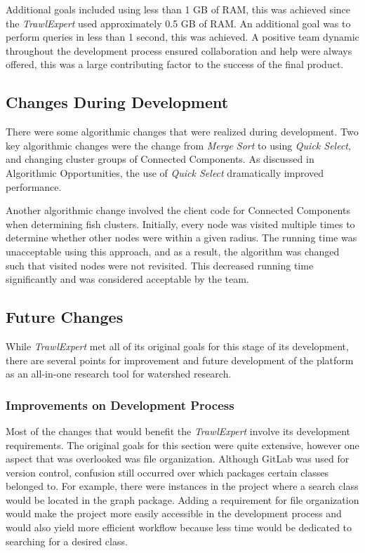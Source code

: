 \documentclass{article}
\begin{document}
Additional goals included using less than 1 GB of RAM, this was achieved since the \textit{TrawlExpert} used approximately 0.5 GB of RAM. An additional goal was to perform queries in less than 1 second, this was achieved. A positive team dynamic throughout the development process ensured collaboration and help were always offered, this was a large contributing factor to the success of the final product. 

\subsection{Changes During Development}
There were some algorithmic changes that were realized during development. Two key algorithmic changes were the change from \textit{Merge Sort} to using \textit{Quick Select}, and changing cluster groups of Connected Components. As discussed in Algorithmic Opportunities, the use of \textit{Quick Select} dramatically improved performance. 

Another algorithmic change involved the client code for Connected Components when determining fish clusters. Initially, every node was visited multiple times to determine whether other nodes were within a given radius. The running time was unacceptable using this approach, and as a result, the algorithm was changed such that visited nodes were not revisited. This decreased running time significantly and was considered acceptable by the team. 

\subsection{Future Changes}
While \textit{TrawlExpert} met all of its original goals for this stage of its development, there are several points for improvement and future development of the platform as an all-in-one research tool for watershed research.

\subsubsection{Improvements on Development Process}
Most of the changes that would benefit the \textit{TrawlExpert} involve its development requirements. The original goals for this section were quite extensive, however one aspect that was overlooked was file organization. Although GitLab was used for version control, confusion still occurred over which packages certain classes belonged to. For example, there were instances in the project where a search class would be located in the graph package. Adding a requirement for file organization would make the project more easily accessible in the development process and would also yield more efficient workflow because less time would be dedicated to searching for a desired class. 
\end{document}
